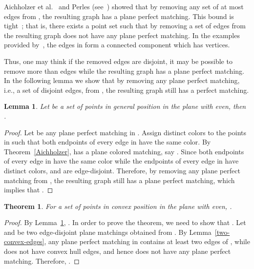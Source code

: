 \documentclass[11pt,a4paper]{article}
\newcommand{\CH}[1]{\text{}}
\newtheorem{lemma}{Lemma}
\newtheorem{theorem}{Theorem}
\begin{document}
Aichholzer et al.~\cite{Aichholzer2010} and Perles (see~\cite{Keller2012}) showed that by removing any set of at most  edges from , the resulting graph has a plane perfect matching. This bound is tight~\cite{Aichholzer2010}; that is, there exists a point set  such that by removing a set  of  edges from  the resulting graph does not have any plane perfect matching. In the examples provided by~\cite{Aichholzer2010}, the  edges in  form a connected component which has  vertices. 

Thus, one may think if the removed edges are disjoint, it may be possible to remove more than  edges while the resulting graph has a plane perfect matching.
In the following lemma we show that by removing any plane perfect matching, i.e., a set of  disjoint edges, from , the resulting graph still has a perfect matching.

\begin{lemma}
\label{pmp2-lemma}
Let  be a set of  points in general position in the plane with  even, then .
\end{lemma}
\begin{proof}
 Let  be any plane perfect matching in . Assign  distinct colors to the points in  such that both endpoints of every edge in  have the same color. By Theorem~\ref{Aichholzer},  has a plane colored matching, say . Since both endpoints of every edge in  have the same color while the endpoints of every edge in  have distinct colors,  and  are edge-disjoint. Therefore, by removing any plane perfect matching from , the resulting graph still has a plane perfect matching, which implies that .
\end{proof}

\begin{theorem}
For a set  of  points in convex position in the plane with  even, .
\end{theorem}
\begin{proof}
By Lemma~\ref{pmp2-lemma}, . In order to prove the theorem, we need to show that . Let  and  be two edge-disjoint plane matchings obtained from \CH{P}. By Lemma~\ref{two-convex-edges}, any plane perfect matching in  contains at least two edges of \CH{P}, while  does not have convex hull edges, and hence does not have any plane perfect matching. Therefore, . 
\end{proof}
\end{document}

